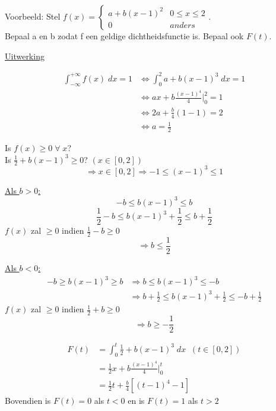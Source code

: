\documentclass[12pt]{report}
\newcommand{\example}[2]{
      \hrulefill
      
      Voorbeeld: #1
      
      \underline{Uitwerking}
      
      #2
      
      \hrulefill
  }
\begin{document}
\example{Stel $f(x) = 
	\begin{cases} 
		a + b(x - 1)^2  & 0 \leq x \leq 2
		               \\ 0 &  anders 
		
	\end{cases}$.\\ 
	Bepaal a en b zodat f een geldige dichtheidsfunctie is. Bepaal ook $F(t)$.}{
	
	\begin{equation*}
		\begin{split}
			\int_{-\infty}^{+\infty} f(x)\; dx = 1 
			& \Leftrightarrow \int_{0}^{2} a + b(x - 1)^3 \; dx = 1 \\
			& \Leftrightarrow ax + b\frac{(x - 1)^4}{4}\bigg|_{0}^{2} = 1 \\
			& \Leftrightarrow 2a + \frac{b}{4}(1 - 1) = 2 \\
			& \Leftrightarrow a = \frac{1}{2}
		\end{split}
	\end{equation*}
	
	Is $f(x) \geq 0\;\forall\;x$?
	\\
	Is $\frac{1}{2} + b(x - 1)^3 \geq 0$? $(x \in [0, 2])$
	$$\Rightarrow x \in [0, 2] \Rightarrow -1 \leq (x - 1)^3 \leq 1$$
	
	\underline{Als $b > 0$:}
	$$- b \leq b(x-1)^3 \leq b$$
	$$\frac{1}{2} - b \leq b(x-1)^3 + \frac{1}{2} \leq b + \frac{1}{2}$$
	$f(x)$ zal $\geq 0$ indien $\frac{1}{2} - b \geq 0$
	$$\Rightarrow b \leq \frac{1}{2}$$
	
	\underline{Als $b < 0$:}
	\begin{equation*}
		\begin{split}
			- b \geq b(x-1)^3 \geq b & \Rightarrow b \leq b(x-1)^3 \leq -b \\
			& \Rightarrow b + \frac{1}{2} \leq b(x-1)^3+ \frac{1}{2}  \leq -b + \frac{1}{2}
		\end{split}
	\end{equation*}
	$f(x)$ zal $\geq 0$ indien $\frac{1}{2} + b \geq 0$
	$$\Rightarrow b \geq -\frac{1}{2}$$
	
	\begin{equation*}
	 \begin{split}
	  F(t) & = \int_{0}^{t} \frac{1}{2} + b(x - 1)^3\; dx \;\; (t \in [0, 2])\\
	       & = \frac{1}{2}x + b\frac{(x-1)^4}{4}\bigg|_{0}^{t} \\
	       & = \frac{1}{2}t + \frac{b}{4}[(t-1)^4 - 1]
	 \end{split}
	\end{equation*}
	Bovendien is $F(t) = 0$ als $t < 0$ en is $F(t) = 1$ als $t > 2$
	
}
\end{document}
